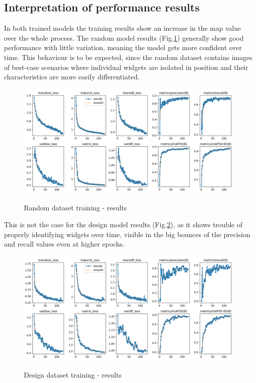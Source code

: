 \documentclass[Bachelor, BIC, english, fhCitStyle, IEEE]{BASE/twbook} %
\begin{document}
\subsection{Interpretation of performance results}\label{result-interpretation}
In both trained models the training results show an increase in the \ac{map} value over the whole process. The random model results (Fig.\ref{fig:random-training-results}) generally show good performance with little variation, meaning the model gets more confident over time. This behaviour is to be expected, since the random dataset contains images of best-case scenarios where individual widgets are isolated in position and their characteristics are more easily differentiated.
\begin{figure}[H]
    \caption{Random dataset training - results}
    \centering
    \includegraphics[width=\textwidth]{PICs/train371/results.png}
    \label{fig:random-training-results}
\end{figure}
\noindent
This is not the case for the design model results (Fig.\ref{fig:design-training-results}), as it shows trouble of properly identifying widgets over time, visible in the big bounces of the precision and recall values even at higher epochs.
\begin{figure}[H]
    \caption{Design dataset training - results}
    \centering
    \includegraphics[width=\textwidth]{PICs/train373/results.png}
    \label{fig:design-training-results}
\end{figure}
\end{document}
